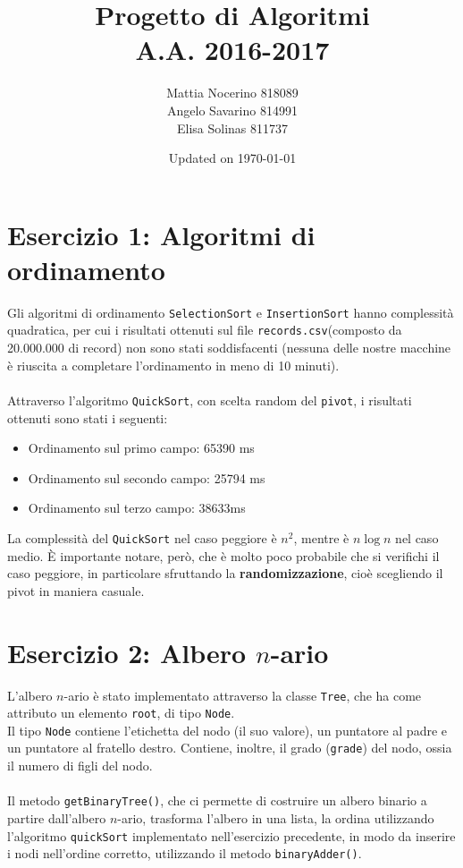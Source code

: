 \documentclass[10pt, oneside]{article}
\title{Progetto di Algoritmi\\
A.A. 2016-2017}
\author{Mattia Nocerino 818089\\
Angelo Savarino 814991\\
Elisa Solinas 811737}
\date{Updated on \today}
\begin{document}
\maketitle
\tableofcontents

\section{Esercizio 1: Algoritmi di ordinamento}
Gli algoritmi di ordinamento \texttt{SelectionSort} e \texttt{InsertionSort} hanno complessità quadratica, per cui i risultati ottenuti sul file \texttt{records.csv}(composto da 20.000.000 di record) non sono stati soddisfacenti (nessuna delle nostre macchine è riuscita a completare l'ordinamento in meno di 10 minuti).\\\\
Attraverso l'algoritmo \texttt{QuickSort}, con scelta random del \texttt{pivot}, i risultati ottenuti sono stati i seguenti:
    \begin{itemize}
        \item{Ordinamento sul primo campo: 65390 ms}
        \item{Ordinamento sul secondo campo: 25794 ms}
        \item{Ordinamento sul terzo campo: 38633ms}
    \end{itemize}
La complessità del \texttt{QuickSort} nel caso peggiore è $n^2$, mentre è $n \log n$ nel caso medio. È importante notare, però, che è molto poco probabile che si verifichi il caso peggiore, in particolare sfruttando la \textbf{randomizzazione}, cioè scegliendo il pivot in maniera casuale.

\section{Esercizio 2: Albero $n$-ario}
L'albero $n$-ario è stato implementato attraverso la classe \texttt{Tree}, che ha come attributo un elemento \texttt{root}, di tipo \texttt{Node}.\\
Il tipo \texttt{Node} contiene l'etichetta del nodo (il suo valore), un puntatore al padre e un puntatore al fratello destro. Contiene, inoltre, il grado (\texttt{grade}) del nodo, ossia il numero di figli del nodo.\\\\
Il metodo \texttt{getBinaryTree()}, che ci permette di costruire un albero binario a partire dall'albero $n$-ario, trasforma l'albero in una lista, la ordina utilizzando l'algoritmo \texttt{quickSort} implementato nell'esercizio precedente, in modo da inserire i nodi nell'ordine corretto, utilizzando il metodo \texttt{binaryAdder()}.
\end{document}
